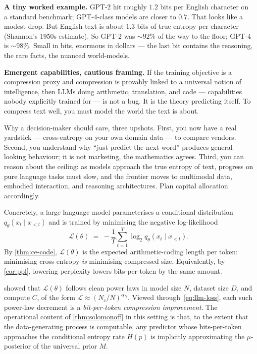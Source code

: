 \documentclass[12pt,a4paper]{article}
\theoremstyle{plain}
\theoremstyle{definition}
\begin{document}
\begin{intuition}
\textbf{A tiny worked example.}  GPT-2 hit roughly $1.2$ bits per
English character on a standard benchmark; GPT-4-class models are
closer to $0.7$.  That looks like a modest drop.  But English text is
about $1.3$ bits of true entropy per character (Shannon's 1950s
estimate).  So GPT-2 was $\sim 92\%$ of the way to the floor; GPT-4
is $\sim 98\%$.  Small in bits, enormous in dollars --- the last bit
contains the reasoning, the rare facts, the nuanced world-models.

\textbf{Emergent capabilities, cautious framing.}  If the training
objective is a compression proxy and compression is provably linked
to a universal notion of intelligence, then LLMs doing arithmetic,
translation, and code --- capabilities nobody explicitly trained for
--- is not a bug.  It is the theory predicting itself.  To compress
text well, you must model the world the text is about.

Why a decision-maker should care, three upshots.  First, you now have
a real yardstick --- cross-entropy on your own domain data --- to
compare vendors.  Second, you understand why ``just predict the next
word'' produces general-looking behaviour; it is not marketing, the
mathematics agrees.  Third, you can reason about the
ceiling: as models approach the true entropy of text, progress on
pure language tasks must slow, and the frontier moves to multimodal
data, embodied interaction, and reasoning architectures.  Plan
capital allocation accordingly.
\end{intuition}

Concretely, a large language model parameterises a conditional
distribution $q_\theta(x_t \mid x_{<t})$ and is trained by minimising
the negative log-likelihood
\begin{equation}
  \mathcal{L}(\theta)
  \;=\; -\frac{1}{T}\sum_{t=1}^{T} \log_2 q_\theta(x_t \mid x_{<t}).
  \label{eq:llm-loss}
\end{equation}
By \cref{thm:ce-code}, $\mathcal{L}(\theta)$ is the expected
arithmetic-coding length per token: minimising cross-entropy \emph{is}
minimising compressed size.  Equivalently, by \cref{cor:ppl}, lowering
perplexity lowers bits-per-token by the same amount.

\citet{kaplan2020scaling} showed that $\mathcal{L}(\theta)$ follows
clean power laws in model size $N$, dataset size $D$, and compute $C$,
of the form $\mathcal{L} \approx (N_c / N)^{\alpha_N}$.  Viewed
through~\eqref{eq:llm-loss}, each such power-law decrement is a
\emph{bit-per-token compression improvement}.  The operational
content of \cref{thm:solomonoff} in this setting is that, to the
extent that the data-generating process is computable, any predictor
whose bits-per-token approaches the conditional entropy rate
$\overline{H}(p)$ is implicitly approximating the $\mu$-posterior of
the universal prior $M$.
\end{document}
